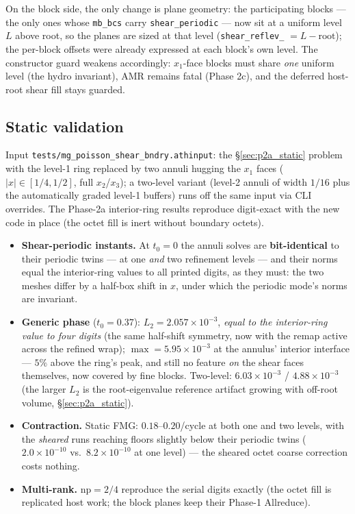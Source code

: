 \documentclass[11pt]{article}
\newcommand{\code}[1]{\texttt{#1}}
\begin{document}
On the block side, the only change is plane geometry: the participating blocks ---
the only ones whose \code{mb\_bcs} carry \code{shear\_periodic} --- now sit at a
uniform level $L$ above root, so the planes are sized at that level
(\code{shear\_reflev\_} $= L - \mathrm{root}$); the per-block offsets were already
expressed at each block's own level. The constructor guard weakens accordingly:
$x_1$-face blocks must share \emph{one} uniform level (the hydro invariant), AMR
remains fatal (Phase 2c), and the deferred host-root shear fill stays guarded.

\subsection{Static validation}
\label{sec:p2b_static}
Input \code{tests/mg\_poisson\_shear\_bndry.athinput}: the \S\ref{sec:p2a_static}
problem with the level-1 ring replaced by two annuli hugging the $x_1$ faces
($|x| \in [1/4, 1/2]$, full $x_2$/$x_3$); a two-level variant (level-2 annuli of
width $1/16$ plus the automatically graded level-1 buffers) runs off the same
input via CLI overrides. The Phase-2a interior-ring results reproduce digit-exact
with the new code in place (the octet fill is inert without boundary octets).
\begin{itemize}
  \item \textbf{Shear-periodic instants.} At $t_0=0$ the annuli solves are
        \textbf{bit-identical} to their periodic twins --- at one \emph{and} two
        refinement levels --- and their norms equal the interior-ring values to
        all printed digits, as they must: the two meshes differ by a half-box
        shift in $x$, under which the periodic mode's norms are invariant.
  \item \textbf{Generic phase} ($t_0=0.37$): $L_2 = 2.057\times10^{-3}$,
        \emph{equal to the interior-ring value to four digits} (the same
        half-shift symmetry, now with the remap active across the refined wrap);
        $\max = 5.95\times10^{-3}$ at the annulus' interior interface --- $5\%$
        above the ring's peak, and still no feature \emph{on} the shear faces
        themselves, now covered by fine blocks. Two-level:
        $6.03\times10^{-3}$ / $4.88\times10^{-3}$ (the larger $L_2$ is the
        root-eigenvalue reference artifact growing with off-root volume,
        \S\ref{sec:p2a_static}).
  \item \textbf{Contraction.} Static FMG: $0.18$--$0.20$/cycle at both one and two
        levels, with the \emph{sheared} runs reaching floors slightly below their
        periodic twins ($2.0\times10^{-10}$ vs.\ $8.2\times10^{-10}$ at one
        level) --- the sheared octet coarse correction costs nothing.
  \item \textbf{Multi-rank.} $\mathrm{np}=2/4$ reproduce the serial digits exactly
        (the octet fill is replicated host work; the block planes keep their
        Phase-1 Allreduce).
\end{itemize}
\end{document}
